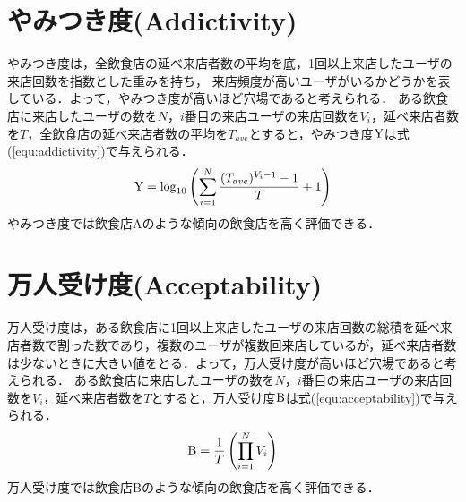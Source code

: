 \section{やみつき度(Addictivity)}

やみつき度は，全飲食店の延べ来店者数の平均を底，1回以上来店したユーザの来店回数を指数とした重みを持ち，
来店頻度が高いユーザがいるかどうかを表している．よって，やみつき度が高いほど穴場であると考えられる．
ある飲食店に来店したユーザの数を$N$，$i$番目の来店ユーザの来店回数を$V_i$，延べ来店者数を$T$，全飲食店の延べ来店者数の平均を$T_{ave}$とすると，やみつき度$\rm Y$は式(\ref{equ:addictivity})で与えられる．
\begin{equation}
	\label{equ:addictivity}
	{\rm Y} = \log_{10}{\left(\sum^{N}_{i=1} \frac{(T_{ave})^{V_i-1}-1}{T}+1\right)}
\end{equation}
やみつき度では飲食店Aのような傾向の飲食店を高く評価できる．

\section{万人受け度(Acceptability)}

万人受け度は，ある飲食店に1回以上来店したユーザの来店回数の総積を延べ来店者数で割った数であり，複数のユーザが複数回来店しているが，延べ来店者数は少ないときに大きい値をとる．よって，万人受け度が高いほど穴場であると考えられる．
ある飲食店に来店したユーザの数を$N$，$i$番目の来店ユーザの来店回数を$V_i$，延べ来店者数を$T$とすると，万人受け度$\rm B$は式(\ref{equ:acceptability})で与えられる．
\begin{equation}
	\label{equ:acceptability}
	{\rm B} = \frac{1}{T} \left(\prod^N_{i=1}V_i\right)
\end{equation}
万人受け度では飲食店Bのような傾向の飲食店を高く評価できる．

